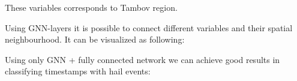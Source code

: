 \documentclass{article}
\begin{document}
These variables corresponds to Tambov region.

Using GNN-layers it is possible to connect different variables and their spatial neighbourhood. It can be visualized as following: 

\begin{figure}[h]
\end{figure}

\newpage
Using only GNN + fully connected network we can achieve good results in classifying timestamps with hail events:
\begin{figure}[h]
\end{figure}
\end{document}
